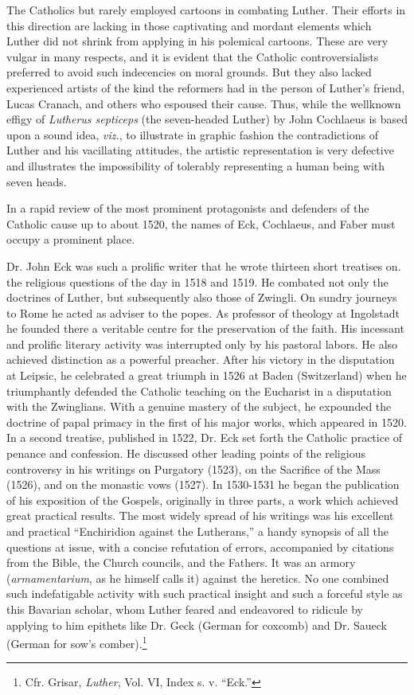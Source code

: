 The Catholics but rarely employed cartoons in combating Luther.
Their efforts in this direction are lacking in those captivating and
mordant elements which Luther did not shrink from applying in his
polemical cartoons. These are very vulgar in many respects, and it is
evident that the Catholic controversialists preferred to avoid such indecencies
on moral grounds. But they also lacked experienced artists
of the kind the reformers had in the person of Luther’s friend, Lucas
Cranach, and others who espoused their cause. Thus, while the wellknown
effigy of \textit{Lutherus septiceps} (the seven-headed Luther) by
John Cochlaeus is based upon a sound idea, \textit{viz.}, to illustrate in
graphic fashion the contradictions of Luther and his vacillating attitudes,
the artistic representation is very defective and illustrates the
impossibility of tolerably representing a human being with seven heads.

In a rapid review of the most prominent protagonists and defenders of the
Catholic cause up to about 1520, the names of Eck, Cochlaeus,
and Faber must occupy a prominent place.

Dr. John Eck was such a prolific writer that he wrote thirteen
short treatises on. the religious questions of the day in 1518 and 1519.
He combated not only the doctrines of Luther, but subsequently also
those of Zwingli. On sundry journeys to Rome he acted as adviser
to the popes. As professor of theology at Ingolstadt he founded there
a veritable centre for the preservation of the faith. His incessant and
prolific literary activity was interrupted only by his pastoral labors. He
also achieved distinction as a powerful preacher. After his victory in
the disputation at Leipsic, he celebrated a great triumph in 1526 at
Baden (Switzerland) when he triumphantly defended the Catholic
teaching on the Eucharist in a disputation with the Zwinglians. With
a genuine mastery of the subject, he expounded the doctrine of papal
primacy in the first of his major works, which appeared in 1520. In
a second treatise, published in 1522, Dr. Eck set forth the Catholic
practice of penance and confession. He discussed other leading points
of the religious controversy in his writings on Purgatory (1523), on
the Sacrifice of the Mass (1526), and on the monastic vows (1527). In
1530-1531 he began the publication of his exposition of the Gospels,
originally in three parts, a work which achieved great practical results.
The most widely spread of his writings was his excellent and practical
“Enchiridion against the Lutherans,” a handy synopsis of all the
questions at issue, with a concise refutation of errors, accompanied by
citations from the Bible, the Church councils, and the Fathers. It was
an armory (\textit{armamentarium}, as he himself calls it) against the heretics.
No one combined such indefatigable activity with such practical
insight and such a forceful style as this Bavarian scholar, whom
Luther feared and endeavored to ridicule by applying to him epithets like
Dr. Geck (German for coxcomb) and Dr. Saueck (German for sow’s comber).\footnote
{Cfr. Grisar, \textit{Luther}, Vol. VI, Index s. v. “Eck.”}


